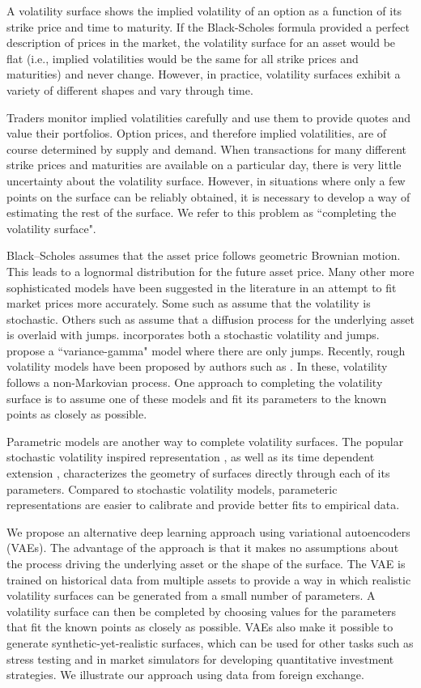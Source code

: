 \documentclass[12pt]{article}
\begin{document}
A volatility surface shows the implied volatility of an option as a function of its strike price and time to maturity. If the Black-Scholes formula provided a perfect description of prices in the market, the volatility surface for an asset would be flat (i.e., implied volatilities would be the same for all strike prices and maturities) and never change. However, in practice, volatility surfaces exhibit a variety of different shapes and vary through time.

Traders monitor implied volatilities carefully and use them to provide quotes and value their  portfolios. Option prices, and therefore implied volatilities, are of course determined by supply and demand. When transactions for many different strike prices and maturities are available on a particular day,  there is very little uncertainty about the volatility surface. However, in situations where only a few points on the surface can be reliably obtained, it is necessary to develop a way of estimating the rest of the surface. We refer to this problem as ``completing the volatility surface".

Black–Scholes assumes that the asset price follows geometric Brownian motion. This leads to  a lognormal distribution for the future asset price. Many other more sophisticated models have been suggested in the literature in an attempt to fit market prices more accurately. Some such as \citet{heston} assume that the volatility is stochastic. Others such as \citet{merton} assume that a diffusion process for the underlying asset is overlaid with jumps. \citet{bates} incorporates both a stochastic volatility and jumps. \citet{madan} propose a ``variance-gamma" model where there are only jumps. Recently, rough volatility models have been proposed by authors such as \citet{rough_gatheral}. In these, volatility follows a non-Markovian process. One approach to completing the volatility surface is to assume one of these models and fit its parameters to the known points as closely as possible. 

Parametric models are another way to complete volatility surfaces. The popular stochastic volatility inspired representation \citep{svi}, as well as its time dependent extension \citep{ssvi}, characterizes the geometry of surfaces directly through each of its parameters. Compared to stochastic volatility models, parameteric representations are easier to calibrate and provide better fits to empirical data.

We propose an alternative deep learning approach using variational autoencoders (VAEs). The advantage of the approach is that it makes no assumptions about the process driving the underlying asset or the shape of the surface. The VAE is trained on historical data from multiple assets to provide a way in which realistic volatility surfaces can be generated from a small number of parameters.  A volatility surface can then be completed by choosing values for the parameters that fit the known points as closely as possible. VAEs also make it possible to generate synthetic-yet-realistic surfaces, which can be used for other tasks such as stress testing and in market simulators for developing quantitative investment strategies. We illustrate our approach using data from foreign exchange.
\end{document}
